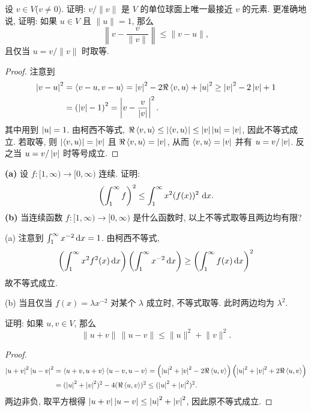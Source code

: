 \documentclass{article}
\begin{document}
\begin{problem}[6A-14]
设 $v \in V$($v \ne 0$). 证明: $v/\lVert v \rVert$ 是 $V$ 的单位球面上唯一最接近 $v$ 的元素. 更准确地说, 证明: 如果 $u \in V$ 且 $\lVert u \rVert = 1$, 那么
\[
\left\lVert v - \frac{v}{\lVert v \rVert} \right\rVert \le \lVert v - u \rVert,
\]
且仅当 $u = v/\lVert v \rVert$ 时取等.
\end{problem}

\begin{proof}
  注意到
  \begin{align*}
    \left|v-u\right|^2
    &=\left\langle v-u, v-u \right\rangle
    =\left|v\right|^2 - 2\Re\left\langle v, u \right\rangle + \left|u\right|^2
    \ge\left|v\right|^2-2\left|v\right|+1\\
    &=\left( \left|v\right|-1 \right)^2=\left|v-\frac{v}{\left|v\right|}\right|^2.
  \end{align*}
  其中用到 $\left|u\right|=1$. 由柯西不等式, $\Re\left\langle v, u \right\rangle \le \left|\left\langle v, u \right\rangle\right| \le \left|v\right|\left|u\right|=\left|v\right|$, 因此不等式成立. 若取等, 则 $\left|\left\langle v, u \right\rangle\right|=\left|v\right|$ 且 $\Re\left\langle v, u \right\rangle=\left|v\right|$, 从而 $\left\langle v, u \right\rangle=\left|v\right|$ 并有 $u=v/\left|v\right|$. 反之当 $u=v/\left|v\right|$ 时等号成立.
\end{proof}



\begin{problem}[6A-18]
\textbf{(a)} 设 $f : [1, \infty) \to [0, \infty)$ 连续. 证明:
\[
\left(\int_1^{\infty} f \right)^2 \le \int_1^{\infty} x^2 (f(x))^2\,\,\mathrm{d} x.
\]
\textbf{(b)} 当连续函数 $f : [1, \infty) \to [0, \infty)$ 是什么函数时, 以上不等式取等且两边均有限?
\end{problem}

\begin{solution}
  (a) 注意到 \( \int_1^\infty x^{-2}\,\mathrm{d} x=1 \). 由柯西不等式, 
  \[ \left( \int_{1}^{\infty}x^2f^2(x)\,\mathrm{d} x \right)\left( \int_{1}^{\infty} x^{-2}\,\mathrm{d} x \right) \ge \left( \int_{1}^{\infty} f(x) \,\mathrm{d} x \right)^2 \]
  故不等式成立.\par
  (b) 当且仅当 \( f(x)=\lambda x^{-2} \) 对某个 \( \lambda \) 成立时, 不等式取等. 此时两边均为 \( \lambda^2 \).
\end{solution}



\begin{problem}[6A-22]
证明: 如果 $u, v \in V$, 那么
\[
\lVert u + v \rVert\,\lVert u - v \rVert \le \lVert u \rVert^2 + \lVert v \rVert^2.
\]
\end{problem}

\begin{proof}
  \begin{align*}
    \left|u+v\right|^2\left|u-v\right|^2
    &=\left\langle u+v, u+v \right\rangle\left\langle u-v, u-v \right\rangle
    =\left( \left|u\right|^2+\left|v\right|^2-2\Re\left\langle u, v \right\rangle \right)\left( \left|u\right|^2+\left|v\right|^2+2\Re\left\langle u, v \right\rangle \right)\\
    &=(\left|u\right|^2+\left|v\right|^2)^2-4(\Re\left\langle u, v \right\rangle)^2
    \le(\left|u\right|^2+\left|v\right|^2)^2.
  \end{align*}
  两边非负, 取平方根得 $\left|u+v\right|\left|u-v\right| \le \left|u\right|^2+\left|v\right|^2$, 因此原不等式成立.
\end{proof}
\end{document}
